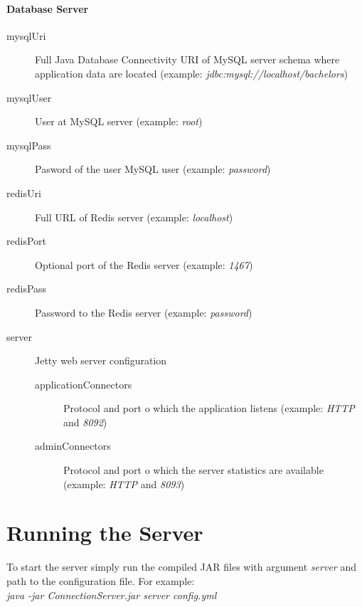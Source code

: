 \paragraph*{Database Server}
\begin{description}
	\item[mysqlUri] Full Java Database Connectivity URI of MySQL server schema where application data are located (example: \textit{jdbc:mysql://localhost/bachelors})
	\item[mysqlUser] User at MySQL server (example: \textit{root})
	\item[mysqlPass] Pasword of the user MySQL user (example: \textit{password})
	\item[redisUri] Full URL of Redis server (example: \textit{localhost})
	\item[redisPort] Optional port of the Redis server (example: \textit{1467})
	\item[redisPass] Password to the Redis server (example: \textit{password})
	\item[server] Jetty web server configuration
	\begin{description}
		\item[applicationConnectors] Protocol and port o which the application listens (example: \textit{HTTP} and \textit{8092})
		\item[adminConnectors] Protocol and port o which the server statistics are available  (example: \textit{HTTP} and \textit{8093})
	\end{description}
\end{description}

\section{Running the Server}
To start the server simply run the compiled JAR files with argument \textit{server} and path to the configuration file. For example:\\
\textit{java -jar ConnectionServer.jar server config.yml}

